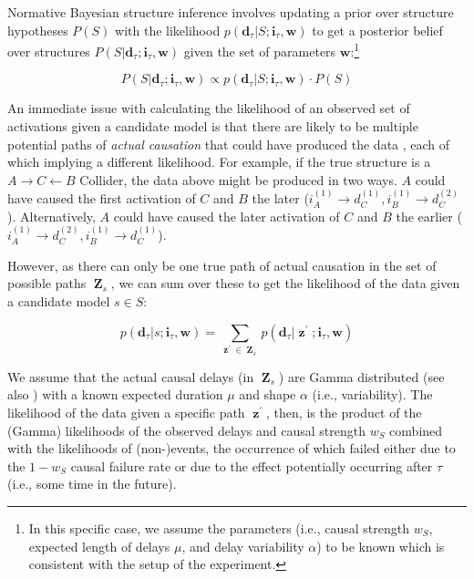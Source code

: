 \documentclass[10pt,letterpaper]{article}
\newcommand{\ww}{\mathbf{w}} %
\newcommand{\ws}{w_S} %
\newcommand{\mm}{s} %
\newcommand{\calm}{S} %
\newcommand{\ci}{\mathbf{i}} %
\newcommand{\da}{\mathbf{d}} %
\DeclareMathOperator*{\zz}{\mathbf{z}} %
\DeclareMathOperator*{\zzz}{\mathbf{Z}} %
\begin{document}
Normative Bayesian structure inference involves updating a prior over structure hypotheses $P(\calm)$ with the likelihood $p(\da_{\tau}|\calm;\ci_{\tau}, \ww)$ to get a posterior belief over structures $P(\calm|\da_{\tau};\ci_{\tau}, \ww)$ given the set of parameters $\ww$:\footnote{In this specific case, we assume the parameters (i.e., causal strength $\ws$, expected length of delays $\mu$, and delay variability $\alpha$) to be known which is consistent with the setup of the experiment.}

\begin{equation}
    P(\calm|\da_{\tau};\ci_{\tau}, \ww) \propto p(\da_{\tau}|\calm;\ci_{\tau}, \ww) \cdot P(\calm)
\end{equation}

An immediate issue with calculating the likelihood of an observed set of activations given a candidate model is that there are likely to be multiple potential paths of \emph{actual causation} that could have produced the data \citep{halpern2016causality}, each of which implying a different likelihood.  For example, if the true structure is a $A\rightarrow C \leftarrow B$ Collider, the data above might be produced in two ways.  $A$ could have caused the first activation of $C$ and $B$ the later ($i_A^{(1)}\rightarrow d_C^{(1)}, i_B^{(1)}\rightarrow d_C^{(2)}$).  Alternatively, $A$ could have caused the later activation of $C$ and $B$ the earlier ($i_A^{(1)}\rightarrow d_C^{(2)}, i_B^{(1)}\rightarrow d_C^{(1)}$). 

However, as there can only be one true path of actual causation in the set of possible paths $\zzz_{\mm}$, we can sum over these to get the likelihood of the data given a candidate model $\mm\in\calm$:

\begin{equation}
p(\da_{\tau}|\mm;\ci_{\tau}, \ww) = \sum_{\zz^\prime \in \zzz_{\mm}}p(\da_{\tau}|{\zz}^{\prime}; \ci_{\tau}, \ww)
\label{eq:ti_mar_li}
\end{equation}

We assume that the actual causal delays (in $\zzz_{\mm}$) are Gamma distributed (see also \citealp{bramley2017time}) with a known expected duration $\mu$ and shape $\alpha$ (i.e., variability). The likelihood of the data given a specific path $\zz^\prime$, then, is the product of the (Gamma) likelihoods of the observed delays and causal strength $\ws$ combined with the likelihoods of (non-)events, the occurrence of which failed either due to the $1-\ws$ causal failure rate or due to the effect potentially occurring after $\tau$ (i.e., some time in the future).
\end{document}
